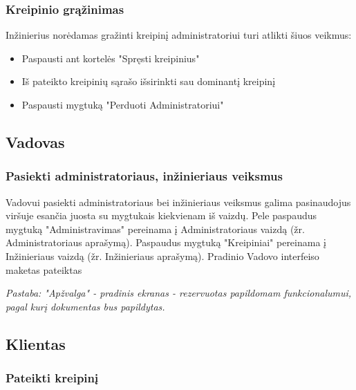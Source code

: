 	\subsubsection{Kreipinio grąžinimas}
	
	Inžinierius norėdamas gražinti kreipinį administratoriui turi atlikti šiuos veikmus:
	
	\begin{itemize}
		\item Paspausti ant kortelės "Spręsti kreipinius" 
		\item Iš pateikto kreipinių sąrašo išsirinkti sau dominantį kreipinį 
		\item Paspausti mygtuką "Perduoti Administratoriui" 
	\end{itemize}

\subsection{Vadovas}

	\subsubsection{Pasiekti administratoriaus, inžinieriaus veiksmus}
		
	
	Vadovui pasiekti administratoriaus bei inžinieriaus veiksmus galima pasinaudojus viršuje esančia juosta su mygtukais kiekvienam iš vaizdų.
	Pele paspaudus mygtuką "Administravimas" pereinama į Administratoriaus vaizdą (žr. Administratoriaus aprašymą).
	Paspaudus mygtuką "Kreipiniai" pereinama į Inžinieriaus vaizdą (žr. Inžinieriaus aprašymą).
	Pradinio Vadovo interfeiso maketas pateiktas 
	
	\textit{Pastaba: "Apžvalga" - pradinis ekranas - rezervuotas papildomam funkcionalumui, pagal kurį dokumentas bus papildytas.}
	
\subsection{Klientas}

	\subsubsection{Pateikti kreipinį}
	
